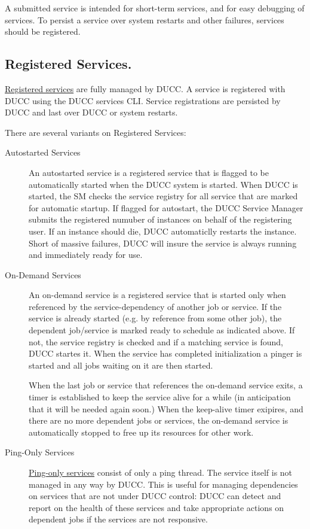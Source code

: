       A submitted service is intended for short-term services, and for easy debugging of services.
      To persist a service over system restarts and other failures, services should be registered.
      
      \subsection{Registered Services.} \hyperref[sec:cli.ducc-services]{Registered services} are
      fully managed by DUCC. A service is registered with DUCC using the DUCC services CLI. Service
      registrations are persisted by DUCC and last over DUCC or system restarts.

      There are several variants on Registered Services:
      \begin{description}

        \item[Autostarted Services] An autostarted service is a registered service that is flagged to be
          automatically started when the DUCC system is started. When DUCC is started, the SM checks the
          service registry for all service that are marked for automatic startup.  If flagged for autostart,
          the DUCC Service Manager submits the registered numuber of instances
          on behalf of the registering user.  If an instance should die, DUCC automaticlly restarts
          the instance.  Short of massive failures, DUCC will insure the service is always running
          and immediately ready for use.
          
        \item[On-Demand Services] An on-demand service is a registered service that is started only
          when referenced by the service-dependency of another job or service. If the service is
          already started (e.g. by reference from some other job), the dependent job/service is
          marked ready to schedule as indicated above. If not, the service registry is checked and
          if a matching service is found, DUCC startes it. When the service has completed
          initialization a pinger is started and all jobs waiting on it are then started.
          
          When the last job or service that references the on-demand service exits, a timer is
          established to keep the service alive for a while (in anticipation that it will be needed
          again soon.)  When the keep-alive timer exipires, and there are no more dependent
          jobs or services, the on-demand service is automatically stopped to free up its resources for
          other work.

        \item[Ping-Only Services] 
          \label{subsub:services.ping-only}
          \hyperref[sec:services.implicit]{Ping-only services} consist of only
          a ping thread.  The service itself is not managed in any way by DUCC.  This is useful for
          managing dependencies on services that are not under DUCC control: DUCC can detect and
          report on the health of these services and take appropriate actions on dependent jobs if
          the services are not responsive.
      \end{description}
